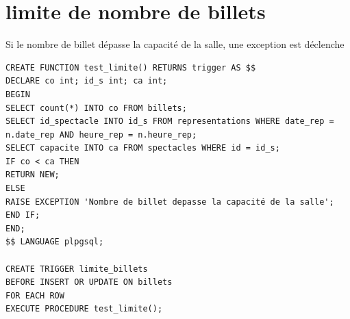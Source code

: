 \documentclass[10pt]{report}
\begin{document}
\section{limite de nombre de billets}
Si le nombre de billet dépasse la capacité de la salle, une exception est déclenche 
\begin{lstlisting}
CREATE FUNCTION test_limite() RETURNS trigger AS $$ 
DECLARE co int; id_s int; ca int;
BEGIN
SELECT count(*) INTO co FROM billets;
SELECT id_spectacle INTO id_s FROM representations WHERE date_rep = n.date_rep AND heure_rep = n.heure_rep;
SELECT capacite INTO ca FROM spectacles WHERE id = id_s;
IF co < ca THEN
RETURN NEW;
ELSE
RAISE EXCEPTION 'Nombre de billet depasse la capacité de la salle';
END IF;
END; 
$$ LANGUAGE plpgsql;

CREATE TRIGGER limite_billets
BEFORE INSERT OR UPDATE ON billets
FOR EACH ROW
EXECUTE PROCEDURE test_limite();
\end{lstlisting}
\end{document}
